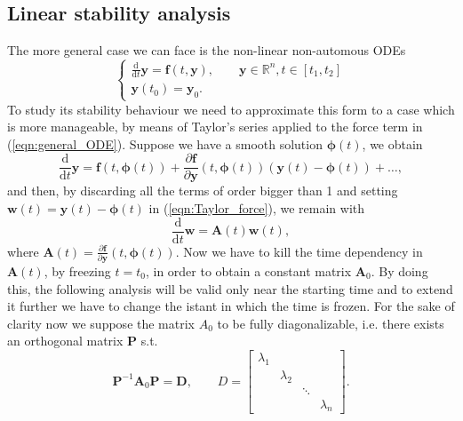 \documentclass[a4paper,11pt ]{report}
\theoremstyle{definition}
\begin{document}
\subsection{Linear stability analysis}
The more general case we can face is the non-linear non-automous ODEs
\begin{equation}
\begin{cases}
\frac{\text{d}}{\text{d} t}\textbf{y}=\textbf{f}(t,\textbf{y}), \qquad \textbf{y}\in\mathbb{R}^n, t\in[t_{1},t_{2}]\\
\textbf{y}(t_0)=\textbf{y}_0.
\end{cases}
\label{eqn:general_ODE}
\end{equation}
To study its stability behaviour we need to approximate this form to a case which is more manageable, by means of Taylor's series applied to the force term in (\ref{eqn:general_ODE}). Suppose we have a smooth solution $\boldsymbol{\phi} (t)$, we obtain
\begin{equation}
\frac{\text{d}}{\text{d} t}\textbf{y}=\textbf{f}(t,\boldsymbol{\phi}(t))+\frac{\partial \textbf{f}}{\partial \textbf{y}}(t,\boldsymbol{\phi}(t))(\textbf{y}(t)-\boldsymbol{\phi}(t))+\dots,
\label{eqn:Taylor_force}
\end{equation}
and then, by discarding all the terms of order bigger than 1 and setting $\textbf{w}(t)=\textbf{y}(t)-\boldsymbol{\phi}(t)$ in (\ref{eqn:Taylor_force}), we remain with
\begin{equation}
\frac{\text{d}}{\text{d} t}\textbf{w}=\textbf{A}(t)\textbf{w}(t),\label{eqn:after_linearization}
\end{equation}
where $\textbf{A}(t)=\frac{\partial \textbf{f}}{\partial \textbf{y}}(t,\boldsymbol{\phi}(t))$. Now we have to kill the time dependency in $\textbf{A}(t)$, by freezing $t=t_0$, in order to obtain a constant matrix $\textbf{A}_0$. By doing this, the following analysis will be valid only near the starting time and to extend it further we have to change the istant in which the time is frozen. 
For the sake of clarity now we suppose the matrix $A_0$ to be  fully diagonalizable, i.e. there exists an orthogonal matrix $\textbf{P}$ s.t.
\begin{equation}
\textbf{P}^{-1}\textbf{A}_0\textbf{P}=\textbf{D}, \qquad 
D=
  \begin{bmatrix}
    \lambda_1 &&&\\
    & \lambda_2 &&\\
    && \ddots &\\ 
    &&& \lambda_n
  \end{bmatrix}.
\label{eqn:diagonalization}
\end{equation}
\end{document}
